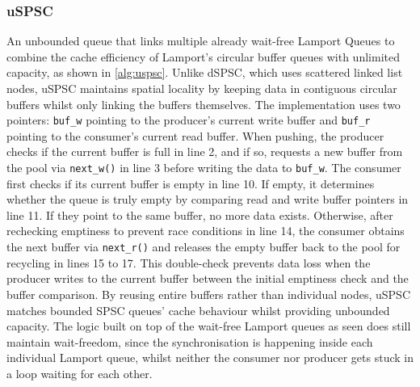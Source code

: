 \subsubsection{\acf{uSPSC}}
An unbounded queue that links multiple already wait-free Lamport Queues to combine the cache efficiency of Lamport's circular buffer queues with unlimited capacity, as shown in \cref{alg:uspsc}. Unlike \ac{dSPSC}, which uses scattered linked list nodes, uSPSC maintains spatial locality by keeping data in contiguous circular buffers whilst only linking the buffers themselves. The implementation uses two pointers: \texttt{buf\_w} pointing to the producer's current write buffer and \texttt{buf\_r} pointing to the consumer's current read buffer. When pushing, the producer checks if the current buffer is full in line 2, and if so, requests a new buffer from the pool via \texttt{next\_w()} in line 3 before writing the data to \texttt{buf\_w}. The consumer first checks if its current buffer is empty in line 10. If empty, it determines whether the queue is truly empty by comparing read and write buffer pointers in line 11. If they point to the same buffer, no more data exists. Otherwise, after rechecking emptiness to prevent race conditions in line 14, the consumer obtains the next buffer via \texttt{next\_r()} and releases the empty buffer back to the pool for recycling in lines 15 to 17. This double-check prevents data loss when the producer writes to the current buffer between the initial emptiness check and the buffer comparison. By reusing entire buffers rather than individual nodes, \ac{uSPSC} matches bounded \ac{SPSC} queues' cache behaviour whilst providing unbounded capacity. The logic built on top of the wait-free Lamport queues as seen does still maintain wait-freedom, since the synchronisation is happening inside each individual Lamport queue, whilst neither the consumer nor producer gets stuck in a loop waiting for each other. \cite{torquati2010singleproducersingleconsumerqueuessharedcache}

